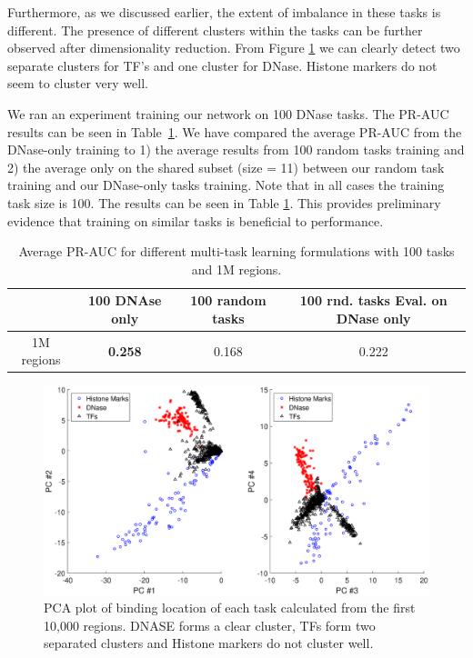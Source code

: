 \documentclass{article}
\begin{document}
Furthermore, as we discussed earlier, the extent of imbalance in these tasks is different. The presence of different clusters within the tasks can be further observed after dimensionality reduction. From Figure \ref{fig:pca} we can clearly detect two separate clusters for TF's and one cluster for DNase. Histone markers do not seem to cluster very well.

We ran an experiment training our network on 100 DNase tasks. The PR-AUC results can be seen in Table~\ref{tab:PR_DNase}. We have compared the average PR-AUC from the DNase-only training to 1) the average results from 100 random tasks training and 2) the average only on the shared subset (size = 11) between our random task training and our DNase-only tasks training. Note that in all cases the training task size is 100. The results can be seen in Table \ref{tab:PR_DNase}. This provides preliminary evidence that training on similar tasks is beneficial to performance.

\begin{table}[h]
\begin{center}
\begin{tabular}{ |c|c|c|c| } 
 \hline
   & 100 DNAse only & 100 random tasks & 100 rnd. tasks Eval. on DNase only \\
 \hline
 1M regions & {\bf 0.258} & 0.168 & 0.222\\
 \hline
\end{tabular}
\vspace{6pt}
\caption{Average PR-AUC for different multi-task learning formulations with 100 tasks and 1M regions.}
\label{tab:PR_DNase}
\end{center}
\end{table}

\begin{figure}
\hspace{-40pt}\includegraphics[width=1.2\textwidth]{figures/PCS.eps}
\caption{PCA plot of binding location of each task calculated from the first 10,000 regions. DNASE forms a clear cluster, TFs form two separated clusters and Histone markers do not cluster well.}
\label{fig:pca}
\end{figure}
\end{document}
